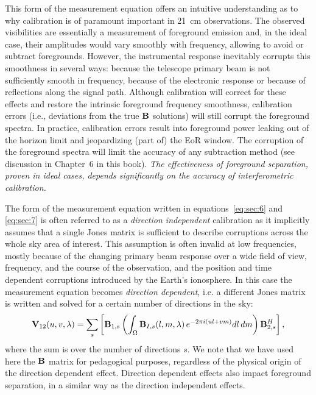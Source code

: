 This form of the measurement equation offers an intuitive understanding as to why calibration is of paramount important in 21~cm observations. The observed visibilities are essentially a measurement of foreground emission and, in the ideal case, their amplitudes would vary smoothly with frequency, allowing to avoid or subtract foregrounds. However, the instrumental response inevitably corrupts this smoothness in several ways: because the telescope primary beam is not sufficiently smooth in frequency, because of the electronic response or because of reflections along the signal path. Although calibration will correct for these effects and restore the intrinsic foreground frequency smoothness, calibration errors (i.e., deviations from the true ${\bf B}$ solutions) will still corrupt the foreground spectra. In practice, calibration errors result into foreground power leaking out of the horizon limit and jeopardizing (part of) the EoR window. The corruption of the foreground spectra will limit the accuracy of any subtraction method (see discussion in Chapter~6 in this book). {\it The effectiveness of foreground separation, proven in ideal cases, depends significantly on the accuracy of interferometric calibration.}

The form of the measurement equation written in equations~\ref{eq:sec:6} and \ref{eq:sec:7} is often referred to as a {\it direction independent} calibration as it implicitly assumes that a single Jones matrix is sufficient to describe corruptions across the whole sky area of interest. This assumption is often invalid at low frequencies, mostly because of the changing primary beam response over a wide field of view, frequency, and the course of the observation, and the position and time dependent corruptions introduced by the Earth's ionosphere. In this case the measurement equation becomes {\it direction dependent}, i.e. a different Jones matrix is written and solved for a certain number of directions in the sky:
\begin{equation}
{\bf V}_{12} (u,v,\lambda) = \sum_s \left[ {\bf B}_{1,s} \left( \int_\Omega {\bf B}_{I,s} (l, m, \lambda) \, e^{-2 \pi i (ul + vm)} dl \, dm  \right) {\bf B}_{2,s}^H \right],
\label{eq:sec:7_added}
\end{equation}
where the sum is over the number of directions $s$. We note that we have used here the ${\bf B}$ matrix for pedagogical purposes, regardless of the physical origin of the direction dependent effect. Direction dependent effects also impact foreground separation, in a similar way as the direction independent effects.
 
